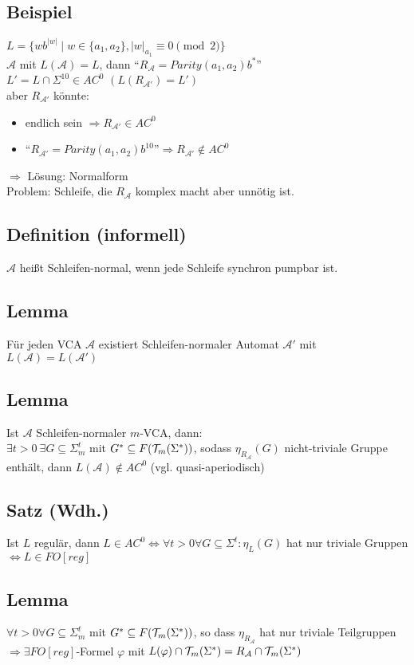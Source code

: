     \subsection{Beispiel}
        $L=\{wb^{|w|}\mid w\in\{a_1,a_2\},|w|_{a_1}\equiv 0\pmod 2\}$\\
        $\mathcal{A}$ mit $L(\mathcal{A})=L$, dann ``$R_\mathcal{A}=Parity(a_1,a_2)b^*$''\\
        $L'=L\cap\Sigma^{10}\in AC^0$ $(L(R_{\mathcal{A}'})=L')$\\
        aber $R_{\mathcal{A}'}$ könnte:
        \begin{itemize}
            \item endlich sein $\Rightarrow R_{\mathcal{A}'}\in AC^0$
            \item ``$R_{\mathcal{A}'}=Parity(a_1,a_2)b^{10}$''$\Rightarrow R_{\mathcal{A}'}\not\in AC^0$
        \end{itemize}
        $\Rightarrow$ Lösung: Normalform\\
        Problem: Schleife, die $R_\mathcal{A}$ komplex macht aber unnötig ist.
    \subsection{Definition (informell)}
        $\mathcal{A}$ heißt Schleifen-normal, wenn jede Schleife synchron pumpbar ist.
    \subsection{Lemma}
        Für jeden VCA $\mathcal {A}$ existiert Schleifen-normaler Automat $\mathcal{A}'$ mit $L(\mathcal{A})=L(\mathcal{A}')$
    \subsection{Lemma}
        Ist $\mathcal{A}$ Schleifen-normaler $m$-VCA, dann:\\
        $\exists t>0\ \exists G\subseteq\Sigma^t_m$ mit $G^*\subseteq F(\mathcal{T}_m(\Sigma^*))$, sodass $\eta_{R_\mathcal{A}}(G)$ nicht-triviale Gruppe enthält, dann $L(\mathcal{A})\not\in AC^0$ (vgl. quasi-aperiodisch)
    \subsection{Satz (Wdh.)}
        Ist $L$ regulär, dann $L\in AC^0\Leftrightarrow\forall t>0\forall G\subseteq\Sigma^t:\eta_L(G)$ hat nur triviale Gruppen $\Leftrightarrow L\in FO[reg]$
    \subsection{Lemma}
        $\forall t>0\forall G\subseteq\Sigma_m^t$ mit $G^*\subseteq F(\mathcal{T}_m(\Sigma^*))$, so dass $\eta_{R_\mathcal{A}}$ hat nur triviale Teilgruppen $\Rightarrow\exists FO[reg]$-Formel $\varphi$ mit $L(\varphi)\cap\mathcal{T}_m(\Sigma^*)=R_\mathcal{A}\cap\mathcal{T}_m(\Sigma^*)$
